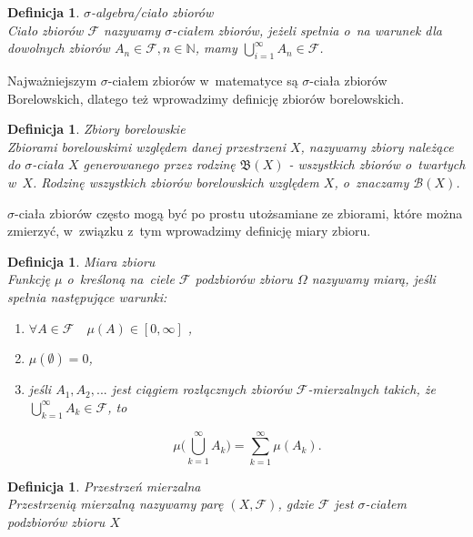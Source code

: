 \documentclass[12pt,a4paper]{report}
\newtheorem{definition}[theorem]{Definicja}
\begin{document}
\begin{definition}{$\sigma$-algebra/ciało zbiorów\cite[Rozdział 8.1]{rudnicki2006}}\\
Ciało zbiorów $\mathcal{F}$ nazywamy $\sigma$-ciałem zbiorów, jeżeli spełnia o~na warunek
dla dowolnych zbiorów $A_{n} \in \mathcal{F}, n \in \mathbb{N}$, mamy
$\bigcup\limits_{i=1}^{\infty} A_n \in \mathcal{F}$.
\end{definition}
Najważniejszym $\sigma$-ciałem zbiorów w~matematyce są $\sigma$-ciała zbiorów Borelowskich, dlatego też wprowadzimy definicję zbiorów borelowskich. 



\begin{definition}{Zbiory borelowskie \cite[w o~praciu o~ rozdział 2]{billingsley1987}}\\
Zbiorami borelowskimi względem danej przestrzeni $X$, nazywamy zbiory należące do $\sigma$-ciała $X$ generowanego przez rodzinę $\mathfrak{B}(X)$ - wszystkich zbiorów o~twartych w~$X$. Rodzinę wszystkich zbiorów borelowskich względem $X$, o~znaczamy $\mathcal{B}(X)$.
\end{definition}

$\sigma$-ciała zbiorów często mogą być po prostu utożsamiane ze zbiorami, które można zmierzyć, w~związku z~tym wprowadzimy definicję miary zbioru.

\begin{definition}{Miara zbioru \cite[Rozdział 2.10] {billingsley1987}}\\
Funkcję $\mu$ o~kreśloną na~ciele $\mathcal{F}$ podzbiorów zbioru $\Omega$ nazywamy miarą, jeśli spełnia następujące warunki: 
\begin{enumerate}
\item $\forall{\textit{A} \in \mathcal{F}} \quad \mu(A) \in [0, \infty]$ ,
\item $\mu(\emptyset)=0$,
\item jeśli $A_1, A_2,...$ jest ciągiem rozłącznych zbiorów $\mathcal{F}$-mierzalnych takich, że $\bigcup\limits_{k=1}^{\infty} A_k \in \mathcal{F}$, to 

$$\mu\big(\bigcup\limits_{k=1}^{\infty} A_k\big)=\sum_{k=1}^{\infty} \mu(A_k).$$

\end{enumerate}
\end{definition}


\begin{definition}{Przestrzeń mierzalna \cite[Rozdział 2.10]{billingsley1987}}\\
Przestrzenią mierzalną nazywamy parę $(X, \mathcal{F})$, gdzie $\mathcal{F}$ jest $\sigma$-ciałem podzbiorów zbioru $X$
\end{definition}
\end{document}
